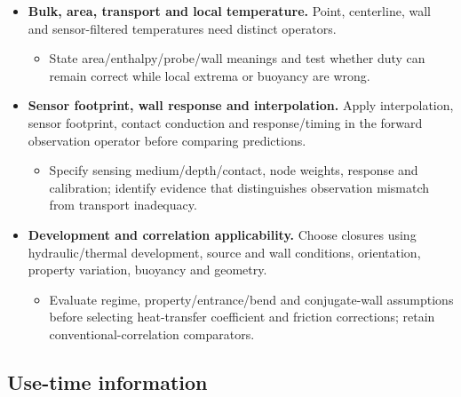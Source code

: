 \begin{itemize}[leftmargin=*]
\item {}\textbf{Bulk, area, transport and local temperature.} Point, centerline, wall and sensor-filtered temperatures need distinct operators.\cite{jcgm2020measurementmodels}
\begin{itemize}
\item State area/\allowbreak{}enthalpy/\allowbreak{}probe/\allowbreak{}wall meanings and test whether duty can remain correct while local extrema or buoyancy are wrong.
\end{itemize}
\item {}\textbf{Sensor footprint, wall response and interpolation.} Apply interpolation, sensor footprint, contact conduction and response/\allowbreak{}timing in the forward observation operator before comparing predictions.\cite{jcgm2020measurementmodels}
\begin{itemize}
\item Specify sensing medium/\allowbreak{}depth/\allowbreak{}contact, node weights, response and calibration; identify evidence that distinguishes observation mismatch from transport inadequacy.
\end{itemize}
\item {}\textbf{Development and correlation applicability.} Choose closures using hydraulic/\allowbreak{}thermal development, source and wall conditions, orientation, property variation, buoyancy and geometry.\cite{reis2024molten}
\begin{itemize}
\item Evaluate regime, property/\allowbreak{}entrance/\allowbreak{}bend and conjugate-wall assumptions before selecting heat-transfer coefficient and friction corrections; retain conventional-correlation comparators.
\end{itemize}
\end{itemize}

\subsection{Use-time information}\label{subsec:use-time-information}

